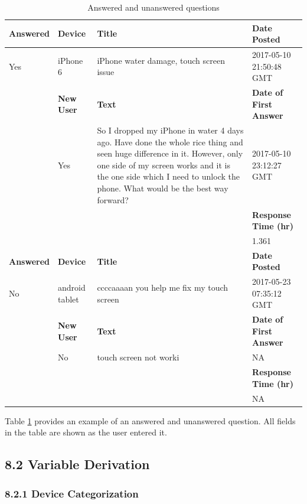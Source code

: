 \documentclass{article}
\begin{document}
\begin{table}[!htbp]
\centering
\begin{tabular}{| l | l | p{6cm} | l |}
  \hline
 \textbf{Answered} & \textbf{Device} & \textbf{Title} & \textbf{Date Posted} \\
  \hline
  Yes & iPhone 6 & iPhone water damage, touch screen issue &  2017-05-10 21:50:48 GMT \\ \cline{2 - 4}
  & \textbf{New User} & \textbf{Text} & \textbf{Date of First Answer} \\ \cline{2 - 4}
  & Yes & So I dropped my iPhone in water 4 days ago. Have done the whole rice thing and seen huge difference in it. However, only one side of my screen works and it is the one side which I need to unlock the phone. What would be the best way forward? & 2017-05-10 23:12:27 GMT \\ \cline{4 - 4}
  & & & \textbf{Response Time (hr)} \\ \cline{4 - 4}
  & & & 1.361 \\ \cline{4-4} \hline
  \textbf{Answered} & \textbf{Device} & \textbf{Title} & \textbf{Date Posted} \\ \cline{1 - 4}
  No & android tablet & ccccaaaan you help me fix my touch screen & 2017-05-23 07:35:12 GMT \\ \cline{2 - 4}
  & \textbf{New User} & \textbf{Text} & \textbf{Date of First Answer} \\ \cline{2 - 4}
  & No & touch screen not worki & NA \\ \cline{4 - 4}
  & & & \textbf{Response Time (hr)} \\ \cline{4 - 4}
  & & & NA \\ 
   \hline
\end{tabular}
\caption{Answered and unanswered questions}
\label{table:questions}
\end{table}

Table \ref{table:questions} provides an example of an answered and unanswered question. All fields in the table are shown as the user entered it. 


\subsection*{8.2 Variable Derivation}

\subsubsection*{8.2.1 Device Categorization}
\end{document}
